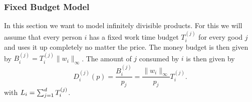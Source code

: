 \subsubsection{Fixed Budget Model}

In this section we want to model infinitely divisible products. For this we will
assume that every person \(i\) has a fixed work time budget \(T_i^{(j)}\) for
every good \(j\) and uses it up completely no matter the price. The money budget
is then given by \(B_i^{(j)} = T_i^{(j)}\|w_i\|_\infty\). The amount of \(j\)
consumed by \(i\) is then given by
\begin{equation}
	\label{eq: fixed budget and consumption relation}
	D_i^{(j)}(p) = \frac{B_i^{(j)}}{p_j} = \frac{\|w_i\|_\infty}{p_j}T_i^{(j)}.
\end{equation}
with \(L_i = \sum_{j=1}^d T_i^{(j)}\).

